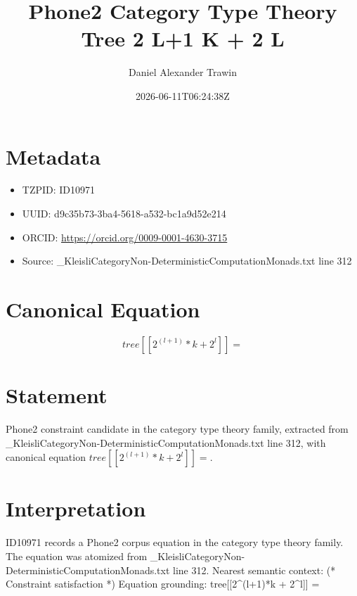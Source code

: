 \documentclass[11pt]{article}
\title{Phone2 Category Type Theory Tree 2 L+1 K + 2 L}
\author{Daniel Alexander Trawin}
\date{2026-06-11T06:24:38Z}
\begin{document}
\maketitle
\section*{Metadata}
\begin{itemize}
\item TZPID: ID10971
\item UUID: d9c35b73-3ba4-5618-a532-bc1a9d52e214
\item ORCID: \url{https://orcid.org/0009-0001-4630-3715}
\item Source: _KleisliCategoryNon-DeterministicComputationMonads.txt line 312
\end{itemize}
\section*{Canonical Equation}
\[
tree[[2^(l+1)*k + 2^l]] =
\]
\section*{Statement}
Phone2 constraint candidate in the category type theory family, extracted from _KleisliCategoryNon-DeterministicComputationMonads.txt line 312, with canonical equation $tree[[2^(l+1)*k + 2^l]] =$.
\section*{Interpretation}
ID10971 records a Phone2 corpus equation in the category type theory family. The equation was atomized from _KleisliCategoryNon-DeterministicComputationMonads.txt line 312. Nearest semantic context: (* Constraint satisfaction *) Equation grounding: tree[[2^(l+1)*k + 2^l]] =
\end{document}
